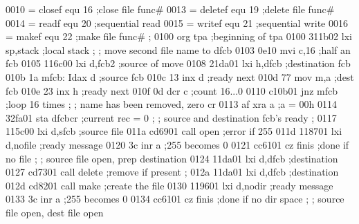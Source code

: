 0010 =                      closef   equ 16         ;close file func#
0013 =                      deletef  equ 19         ;delete file func#
0014 =                      readf    equ 20         ;sequential read
0015 =                      writef   equ 21         ;sequential write
0016 =                      makef    equ 22         ;make file func#
                            ;
0100                                 org tpa        ;beginning of tpa
0100 311b02                          lxi sp,stack   ;local stack
                            ;
                            ;        move second file name to dfcb
0103 0e10                            mvi c,16       ;half an fcb
0105 116c00                          lxi d,fcb2     ;source of move
0108 21da01                          lxi h,dfcb     ;destination fcb
010b 1a                     mfcb:    Idax d         ;source fcb
010c 13                              inx  d         ;ready next
010d 77                              mov  m,a       ;dest fcb
010e 23                              inx  h         ;ready next
010f 0d                              dcr  c         ;count 16...0
0110 c10b01                          jnz  mfcb      ;loop 16 times
                            ;
                            ;        name has been removed, zero cr
0113 af                              xra  a         ;a = 00h
0114 32fa01                          sta  dfcbcr    ;current rec = 0
                            ;
                            ;        source and destination fcb's ready
                            ;
0117 115c00                          lxi  d,sfcb    ;source file
011a cd6901                          call open      ;error if 255
011d 118701                          lxi  d,nofile  ;ready message
0120 3c                              inr  a         ;255 becomes 0
0121 cc6101                          cz   finis     ;done if no file
                            ;
                            ;        source file open, prep destination
0124 11da01                          lxi  d,dfcb    ;destination
0127 cd7301                          call delete    ;remove if present
                            ;
012a 11da01                          lxi  d,dfcb    ;destination
012d cd8201                          call make      ;create the file
0130 119601                          lxi  d,nodir   ;ready message
0133 3c                              inr  a         ;255 becomes 0
0134 cc6101                          cz   finis     ;done if no dir space
                            ;
                            ;        source file open, dest file open
